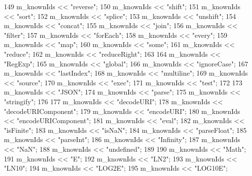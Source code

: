 \begin{DoxyCode}
149     m\_knownIds << \textcolor{stringliteral}{"reverse"};
150     m\_knownIds << \textcolor{stringliteral}{"shift"};
151     m\_knownIds << \textcolor{stringliteral}{"sort"};
152     m\_knownIds << \textcolor{stringliteral}{"splice"};
153     m\_knownIds << \textcolor{stringliteral}{"unshift"};
154     m\_knownIds << \textcolor{stringliteral}{"concat"};
155     m\_knownIds << \textcolor{stringliteral}{"join"};
156     m\_knownIds << \textcolor{stringliteral}{"filter"};
157     m\_knownIds << \textcolor{stringliteral}{"forEach"};
158     m\_knownIds << \textcolor{stringliteral}{"every"};
159     m\_knownIds << \textcolor{stringliteral}{"map"};
160     m\_knownIds << \textcolor{stringliteral}{"some"};
161     m\_knownIds << \textcolor{stringliteral}{"reduce"};
162     m\_knownIds << \textcolor{stringliteral}{"reduceRight"};
163 
164     m\_knownIds << \textcolor{stringliteral}{"RegExp"};
165     m\_knownIds << \textcolor{stringliteral}{"global"};
166     m\_knownIds << \textcolor{stringliteral}{"ignoreCase"};
167     m\_knownIds << \textcolor{stringliteral}{"lastIndex"};
168     m\_knownIds << \textcolor{stringliteral}{"multiline"};
169     m\_knownIds << \textcolor{stringliteral}{"source"};
170     m\_knownIds << \textcolor{stringliteral}{"exec"};
171     m\_knownIds << \textcolor{stringliteral}{"test"};
172 
173     m\_knownIds << \textcolor{stringliteral}{"JSON"};
174     m\_knownIds << \textcolor{stringliteral}{"parse"};
175     m\_knownIds << \textcolor{stringliteral}{"stringify"};
176 
177     m\_knownIds << \textcolor{stringliteral}{"decodeURI"};
178     m\_knownIds << \textcolor{stringliteral}{"decodeURIComponent"};
179     m\_knownIds << \textcolor{stringliteral}{"encodeURI"};
180     m\_knownIds << \textcolor{stringliteral}{"encodeURIComponent"};
181     m\_knownIds << \textcolor{stringliteral}{"eval"};
182     m\_knownIds << \textcolor{stringliteral}{"isFinite"};
183     m\_knownIds << \textcolor{stringliteral}{"isNaN"};
184     m\_knownIds << \textcolor{stringliteral}{"parseFloat"};
185     m\_knownIds << \textcolor{stringliteral}{"parseInt"};
186     m\_knownIds << \textcolor{stringliteral}{"Infinity"};
187     m\_knownIds << \textcolor{stringliteral}{"NaN"};
188     m\_knownIds << \textcolor{stringliteral}{"undefined"};
189 
190     m\_knownIds << \textcolor{stringliteral}{"Math"};
191     m\_knownIds << \textcolor{stringliteral}{"E"};
192     m\_knownIds << \textcolor{stringliteral}{"LN2"};
193     m\_knownIds << \textcolor{stringliteral}{"LN10"};
194     m\_knownIds << \textcolor{stringliteral}{"LOG2E"};
195     m\_knownIds << \textcolor{stringliteral}{"LOG10E"};

\end{DoxyCode}
